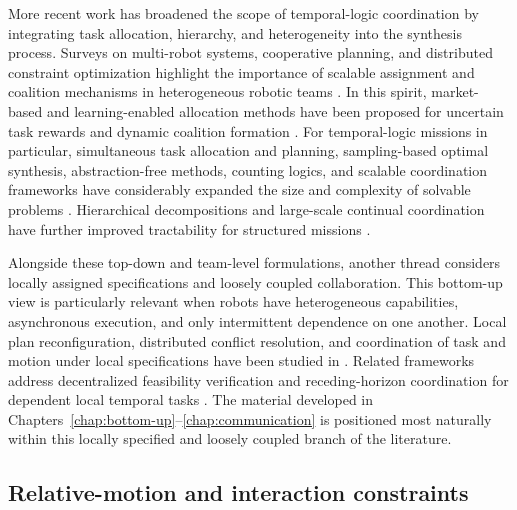 More recent work has broadened the scope of temporal-logic coordination by
integrating task allocation, hierarchy, and heterogeneity into the synthesis
process. Surveys on multi-robot systems, cooperative planning, and distributed
constraint optimization highlight the importance of scalable assignment and
coalition mechanisms in heterogeneous robotic teams
\cite{arai2002advances,torreno2017cooperative,fioretto2018distributed}. In this
spirit, market-based and learning-enabled allocation methods have been proposed
for uncertain task rewards and dynamic coalition formation
\cite{zhao2021market,dai2024dynamic}. For temporal-logic missions in particular,
simultaneous task allocation and planning, sampling-based optimal synthesis,
abstraction-free methods, counting logics, and scalable coordination frameworks
have considerably expanded the size and complexity of solvable problems
\cite{schillinger2018simultaneous,kantaros2020stylus,luo2021abstraction,
  luo2022temporal,sahin2019multirobot,leahy2021scalable,cardona2024planning}.
Hierarchical decompositions and large-scale continual coordination have further
improved tractability for structured missions
\cite{luo2024decomposition,luo2025hulk,luo2025simultaneous}.

Alongside these top-down and team-level formulations, another thread considers
locally assigned specifications and loosely coupled collaboration. This bottom-up
view is particularly relevant when robots have heterogeneous capabilities,
asynchronous execution, and only intermittent dependence on one another. Local
plan reconfiguration, distributed conflict resolution, and coordination of task
and motion under local specifications have been studied in
\cite{guo2014distributed,guo2015multi,guo2015bottom,guo2016task}. Related
frameworks address decentralized feasibility verification and receding-horizon
coordination for dependent local temporal tasks
\cite{filippidis2012decentralized,tumova2014receding}. The material developed in
Chapters~\ref{chap:bottom-up}--\ref{chap:communication} is positioned most
naturally within this locally specified and loosely coupled branch of the
literature.

\subsection{Relative-motion and interaction constraints}

